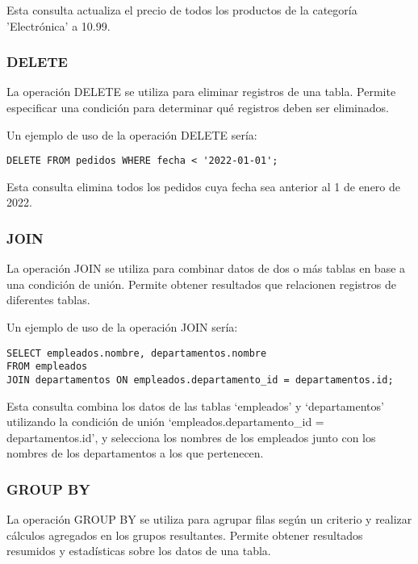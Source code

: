 \documentclass[executivepaper]{article}
\begin{document}
Esta consulta actualiza el precio de todos los productos de la categoría 'Electrónica' a 10.99.

\subsubsection*{DELETE}

La operación DELETE se utiliza para eliminar registros de una tabla. Permite especificar una condición para determinar qué registros deben ser eliminados.

Un ejemplo de uso de la operación DELETE sería:

\begin{lstlisting}
DELETE FROM pedidos WHERE fecha < '2022-01-01';
\end{lstlisting}

Esta consulta elimina todos los pedidos cuya fecha sea anterior al 1 de enero de 2022.

\subsubsection*{JOIN}

La operación JOIN se utiliza para combinar datos de dos o más tablas en base a una condición de unión. Permite obtener resultados que relacionen registros de diferentes tablas.

Un ejemplo de uso de la operación JOIN sería:

\begin{lstlisting}
SELECT empleados.nombre, departamentos.nombre
FROM empleados
JOIN departamentos ON empleados.departamento_id = departamentos.id;
\end{lstlisting}

Esta consulta combina los datos de las tablas \enquote*{empleados} y \enquote*{departamentos} utilizando la condición de unión \enquote*{empleados.departamento\_id = departamentos.id}, y selecciona los nombres de los empleados junto con los nombres de los departamentos a los que pertenecen.

\subsubsection*{GROUP BY}

La operación GROUP BY se utiliza para agrupar filas según un criterio y realizar cálculos agregados en los grupos resultantes. Permite obtener resultados resumidos y estadísticas sobre los datos de una tabla.
\end{document}
